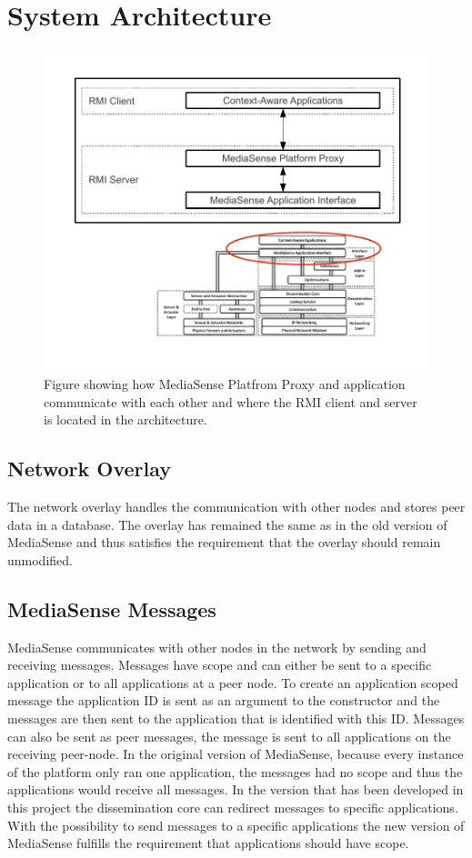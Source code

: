 \section{System Architecture}

\begin{figure}[h!]
	\centering
    	\includegraphics{part_6/artefact_description/changes.pdf}
		\caption{Figure showing how MediaSense Platfrom Proxy and application communicate with each other and where the RMI client and server is located in the architecture.} 
		\label{ds}
\end{figure}

\subsection{Network Overlay}
The network overlay handles the communication with other nodes and stores peer data in a database. The overlay has remained the same as in the old version of MediaSense and thus satisfies the requirement that the overlay should remain unmodified.

\subsection{MediaSense Messages}
MediaSense communicates with other nodes in the network by sending and receiving messages. Messages have scope and can either be sent to a specific application or to all applications at a peer node. 
To create an application scoped message the application ID is sent as an argument to the constructor and the messages are then sent to the application that is identified with this ID. 
Messages can also be sent as peer messages, the message is sent to all applications on the receiving peer-node. In the original version of MediaSense, because every instance of the platform only ran one application, the messages had no scope and thus the applications would receive all messages. 
In the version that has been developed in this project the dissemination core can redirect messages to specific applications. With the possibility to send messages to a specific applications the new version of MediaSense fulfills the requirement that applications should have scope.

